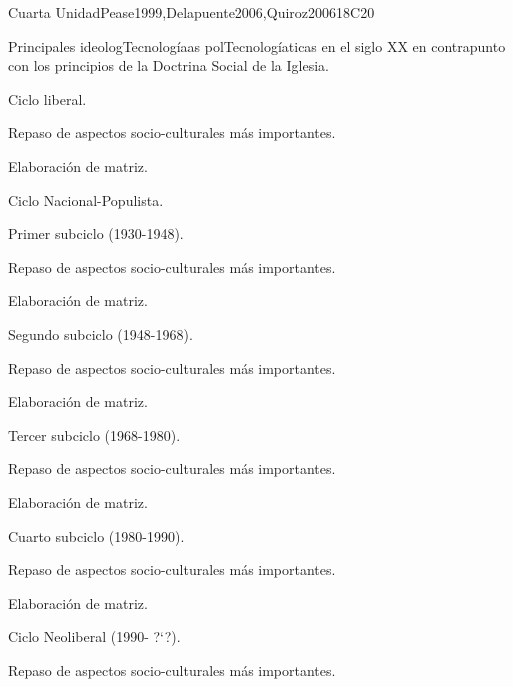 \begin{syllabus}
\begin{unit}{}{Cuarta Unidad}{Pease1999,Delapuente2006,Quiroz2006}{18}{C20}
\begin{topics}
    \item Principales ideologTecnologíaas polTecnologíaticas en el siglo XX en contrapunto con los principios de la Doctrina Social de la Iglesia.
    \item Ciclo liberal.
	\begin{subtopics}
	    \item Repaso de  aspectos socio-culturales más importantes.
	    \item Elaboración de matriz.
	\end{subtopics}
    \item Ciclo Nacional-Populista.
      \begin{subtopics}
	\item Primer subciclo (1930-1948).
	      \begin{subtopics}
		\item Repaso de  aspectos socio-culturales más importantes.
		\item Elaboración de matriz.
	      \end{subtopics}
	\item Segundo subciclo (1948-1968).
	      \begin{subtopics}
		\item Repaso de  aspectos socio-culturales más importantes.
		\item Elaboración de matriz.
	      \end{subtopics}
	\item Tercer subciclo (1968-1980).
	      \begin{subtopics}
		\item Repaso de  aspectos socio-culturales más importantes.
		\item Elaboración de matriz.
	      \end{subtopics}
	\item Cuarto subciclo (1980-1990).
	      \begin{subtopics}
		\item Repaso de  aspectos socio-culturales más importantes.
		\item Elaboración de matriz.
	    \end{subtopics}
      \end{subtopics}
    \item Ciclo Neoliberal (1990- ?`?).
	  \begin{subtopics}
	    \item Repaso de  aspectos socio-culturales más importantes.

\end{subtopics}
\end{topics}
\end{unit}
\end{syllabus}
